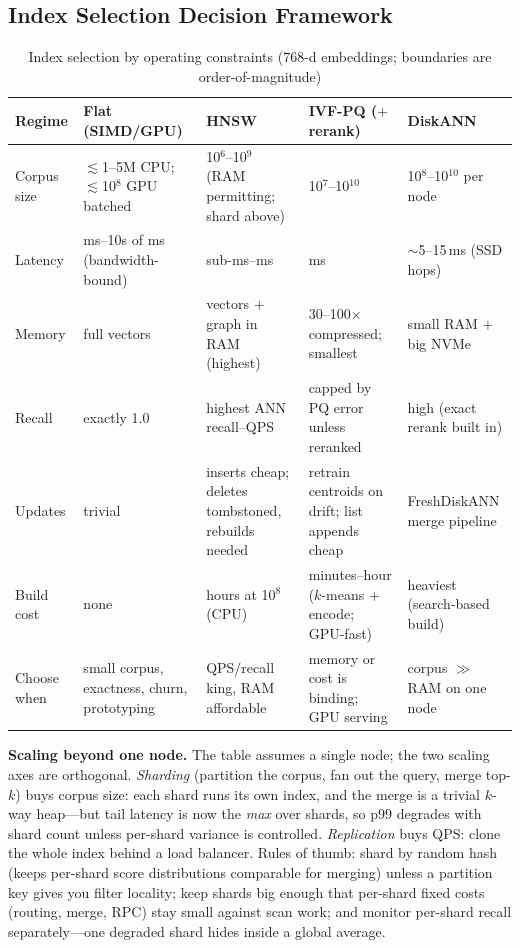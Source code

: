 \subsection{Index Selection Decision Framework}

\begin{table}[H]
\centering
\small
\caption{Index selection by operating constraints (768-d embeddings; boundaries are order-of-magnitude)}
\label{sr:tab:index_selection}
\begin{tabularx}{\textwidth}{lXXXX}
\toprule
\textbf{Regime} & \textbf{Flat (SIMD/GPU)} & \textbf{HNSW} & \textbf{IVF-PQ ($+$rerank)} & \textbf{DiskANN} \\
\midrule
Corpus size & $\lesssim$1--5M CPU; $\lesssim$10$^8$ GPU batched & 10$^6$--10$^9$ (RAM permitting; shard above) & 10$^7$--10$^{10}$ & 10$^8$--10$^{10}$ per node \\
Latency & ms--10s of ms (bandwidth-bound) & sub-ms--ms & ms & $\sim$5--15\,ms (SSD hops) \\
Memory & full vectors & vectors $+$ graph in RAM (highest) & 30--100$\times$ compressed; smallest & small RAM $+$ big NVMe \\
Recall & exactly 1.0 & highest ANN recall--QPS & capped by PQ error unless reranked & high (exact rerank built in) \\
Updates & trivial & inserts cheap; deletes tombstoned, rebuilds needed & retrain centroids on drift; list appends cheap & FreshDiskANN merge pipeline \\
Build cost & none & hours at 10$^8$ (CPU) & minutes--hour ($k$-means $+$ encode; GPU-fast) & heaviest (search-based build) \\
Choose when & small corpus, exactness, churn, prototyping & QPS/recall king, RAM affordable & memory or cost is binding; GPU serving & corpus $\gg$ RAM on one node \\
\bottomrule
\end{tabularx}
\end{table}

\textbf{Scaling beyond one node.} The table assumes a single node; the two scaling axes are orthogonal. \emph{Sharding} (partition the corpus, fan out the query, merge top-$k$) buys corpus size: each shard runs its own index, and the merge is a trivial $k$-way heap---but tail latency is now the \emph{max} over shards, so p99 degrades with shard count unless per-shard variance is controlled. \emph{Replication} buys QPS: clone the whole index behind a load balancer. Rules of thumb: shard by random hash (keeps per-shard score distributions comparable for merging) unless a partition key gives you filter locality; keep shards big enough that per-shard fixed costs (routing, merge, RPC) stay small against scan work; and monitor per-shard recall separately---one degraded shard hides inside a global average.

